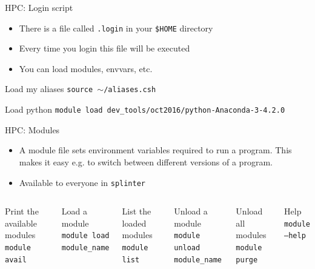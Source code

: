 \documentclass{beamer}
\begin{document}
\begin{frame}{HPC: Login script}
  \begin{itemize}
    \item There is a file called \texttt{.login} in your \texttt{\$HOME} directory
    \item Every time you login this file will be executed
    \item You can load modules, envvars, etc.
  \end{itemize}
  \begin{Examples}
    \begin{block}{Load my aliases}
      \texttt{source $\sim$/aliases.csh}
    \end{block}
    \begin{block}{Load python}
      \texttt{module load dev\_tools/oct2016/python-Anaconda-3-4.2.0}
    \end{block}
  \end{Examples}
\end{frame}

\begin{frame}{HPC: Modules}
	\begin{itemize}
		\item A module file sets environment variables required to run a program. This makes it easy e.g. to switch between different versions of a program.
		\item Available to everyone in \texttt{splinter}
	\end{itemize}
	
	\begin{Examples}
	    \begin{columns}
		\begin{block}{Print the available modules}
			\texttt{module avail}
		\end{block}
		\begin{block}{Load a module}
			\texttt{module load module\_name}
		\end{block}
		\begin{block}{List the loaded modules}
			\texttt{module list}
		\end{block}
	
		\begin{block}{Unload a module}
			\texttt{module unload module\_name}
		\end{block}
		\begin{block}{Unload all modules}
			\texttt{module purge}
		\end{block}		
		\begin{block}{Help}
			\texttt{module --help}
		\end{block}	
	    \end{columns}								
	\end{Examples}
\end{frame}
\end{document}
